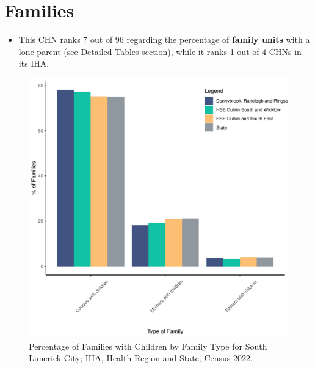 \documentclass{article}
\begin{document}
\section{Families}\label{sect:Fam}
\begin{itemize}
\item This CHN ranks  7 out of 96 regarding the percentage of \textbf{family units} with a lone parent (see Detailed Tables section), while it ranks   1 out of 4 CHNs in its IHA.
\end{itemize}
\begin{figure}[H]
	\centering
	\includegraphics[width = 150mm]{../figures/FamED.pdf}
	\caption{Percentage of Families with Children by Family Type for South Limerick City; IHA, Health Region and State; Census 2022.}
	\label{fig:vbnv}
	\end{figure}
	
\end{document}
